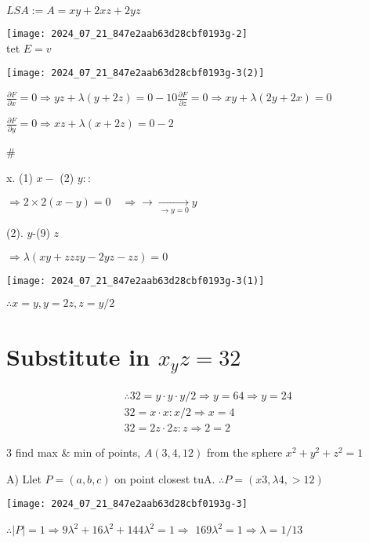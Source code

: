 \documentclass[12pt, a4paper]{article}
\begin{document}
$L S A:=A=x y+2 x z+2 y z$

\texttt{[image: 2024\_07\_21\_847e2aab63d28cbf0193g-2]}\\
tet $E=v$

\begin{center}
\texttt{[image: 2024\_07\_21\_847e2aab63d28cbf0193g-3(2)]}
\end{center}

$\frac{\partial F}{\partial x}=0 \Rightarrow y z+\lambda(y+2 z)=0-10 \frac{\partial F}{\partial z}=0 \Rightarrow x y+\lambda(2 y+2 x)=0$

$\frac{\partial F}{\partial y}=0 \Rightarrow x z+\lambda(x+2 z)=0-2$

\#

x. (1) $x-$ (2) $y::$

$\Rightarrow 2 \times 2(x-y)=0 \quad \Rightarrow \longrightarrow \underset{\rightarrow y=0}{\rightarrow} y$

(2). $y$-(9) $z$

$\Rightarrow \lambda(x y+z z z y-2 y z-z z)=0$

\begin{center}
\texttt{[image: 2024\_07\_21\_847e2aab63d28cbf0193g-3(1)]}
\end{center}

$\therefore x=y, y=2 z, z=y / 2$

\section*{Substitute in $x_{y} z=32$}
$$
\begin{aligned}
& \therefore 32=y \cdot y \cdot y / 2 \Rightarrow y=64 \Rightarrow y=24 \\
& 32=x \cdot x: x / 2 \Rightarrow x=4 \\
& 32=2 z \cdot 2 z: z \Rightarrow 2=2
\end{aligned}
$$

3 find max \& min of points, $A(3,4,12)$ from the sphere $x^{2}+y^{2}+z^{2}=1$

A) Llet $P=(a, b, c)$ on point closest tuA. $\therefore P=(x 3, \lambda 4,>12)$

\begin{center}
\texttt{[image: 2024\_07\_21\_847e2aab63d28cbf0193g-3]}
\end{center}

$\therefore|P|=1 \Rightarrow 9 \lambda^{2}+16 \lambda^{2}+144 \lambda^{2}=1 \Rightarrow$ $169 \lambda^{2}=1 \Rightarrow \lambda=1 / 13$
\end{document}
